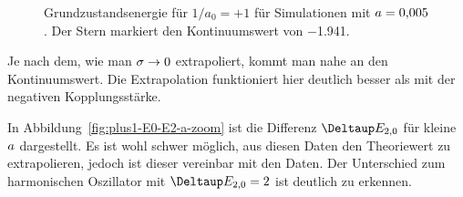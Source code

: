 \begin{figure}[htbp]
    \centering
    \caption{%
        Grundzustandsenergie für $1/a_0 = +1$ für Simulationen mit $a =
        \num{0.005}$. Der Stern markiert den Kontinuumswert von \num{-1.941}.
    }
    \label{fig:plus1-E0-sigma-0p005}
\end{figure}

Je nach dem, wie man $\sigma \to 0$ extrapoliert, kommt man nahe an den
Kontinuumswert. Die Extrapolation funktioniert hier deutlich besser als mit der
negativen Kopplungsstärke.

\FloatBarrier

In Abbildung~\ref{fig:plus1-E0-E2-a-zoom} ist die Differenz $\Deltaup E_{2,0}$
für kleine $a$ dargestellt. Es ist wohl schwer möglich, aus diesen
Daten den Theoriewert zu extrapolieren, jedoch ist dieser vereinbar mit den
Daten. Der Unterschied zum harmonischen Oszillator mit $\Deltaup E_{2,0} = 2$
ist deutlich zu erkennen.

